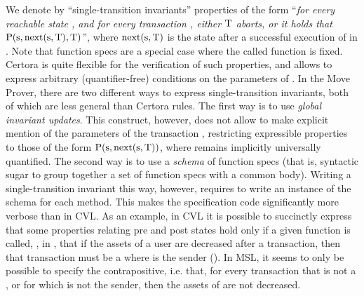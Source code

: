 We denote by ``single-transition invariants'' properties of the form ``\emph{for every reachable state \state, and for every transaction \method, either $\method$ aborts, or it holds that $\Prop(\state, \nexts(\state, \method), \method)$}'',
 where $\nexts(\state, \method)$ is the state after a successful execution of \method in \state.  
 Note that function specs are a special case where the called function is fixed.
Certora is quite flexible for the verification of such properties, and allows to express arbitrary (quantifier-free) conditions on the parameters of \method.
In the Move Prover, there are two different ways to express single-transition invariants, both of which are less general than Certora rules.
The first way is to use \emph{global invariant updates}. 
This construct, however, does not %
allow to make explicit mention of the parameters of the transaction \method,   restricting expressible properties to those of the form $\Prop(\state, \nexts(\state, \method))$, where \method remains implicitly universally quantified. 
The second way is to use a \emph{schema} of function specs (that is, syntactic sugar to group together a set of function specs with a common body). 
Writing a single-transition invariant this way, however, requires to write an instance of the schema for each method.
This makes the specification code significantly more verbose than in CVL.
As an example, in CVL it is possible to succinctly express that some properties relating pre and post states hold only if a given function is called,
\eg, in , 
that if the assets of a user  are decreased after a transaction, then that transaction must be a  where  is the sender ().
In MSL, it seems to   only be  possible to specify the contrapositive, i.e. that, for every transaction that is not a , or for which  is not the sender, then the assets of  are not decreased.
